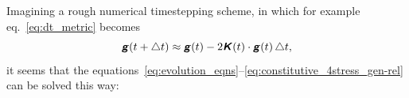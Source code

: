 \documentclass[\ifafour a4paper,12pt,\else a5paper,10pt,\fi%
onecolumn,oneside,article,%
british%
]{memoir}
\theoremstyle{remark}
\theoremstyle{innote}
\newcommand*{\mathte}[1]{\textbf{\textit{\textsf{#1}}}}
\newcommand*{\incr}{\triangle}%
\renewcommand*{\|}{\nonscript\,\vert\nonscript\;\mathopen{}}
\newcommand*{\eqn}{eq.}%
\newcommand*{\yTT}{\tau}
\newcommand*{\yT}{\bm{\yTT}}
\newcommand*{\ygg}{g}
\newcommand*{\yg}{\mathte{\ygg}}
\newcommand*{\yKK}{K}
\newcommand*{\yK}{\mathte{\yKK}}
\newcommand*{\ypp}{q}
\newcommand*{\yp}{\bm{\ypp}}
\newcommand*{\ye}{\epsilon}
\begin{document}

Imagining a rough numerical timestepping scheme, in which for example
\eqn~\eqref{eq:dt_metric} becomes
\begin{equation}
  \label{eq:approx_timestepping_dt_metric}
  \yg(t + \incr t) \approx \yg(t) -2\yK(t)\cdot\yg(t)\,\incr t,
\end{equation}
it seems that the
equations~\eqref{eq:evolution_eqns}--\eqref{eq:constitutive_4stress_gen-rel}
can be solved this way:
\end{document}
